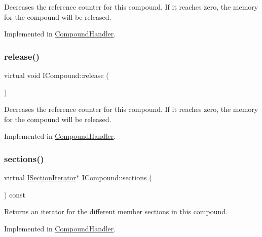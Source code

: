 Decreases the reference counter for this compound. If it reaches zero, the memory for the compound will be released. 

Implemented in \mbox{\hyperlink{class_compound_handler_a29f352627cbc021762c72835dfb63778}{Compound\+Handler}}.

\mbox{\label{class_i_compound_a5388c74d390323ce610f752a01456b21}} 
\subsubsection{\texorpdfstring{release()}{release()}\hspace{0.1cm}{\footnotesize\ttfamily [2/2]}}
{\footnotesize\ttfamily virtual void I\+Compound\+::release (\begin{DoxyParamCaption}{ }\end{DoxyParamCaption})\hspace{0.3cm}{\ttfamily [pure virtual]}}

Decreases the reference counter for this compound. If it reaches zero, the memory for the compound will be released. 

Implemented in \mbox{\hyperlink{class_compound_handler_a29f352627cbc021762c72835dfb63778}{Compound\+Handler}}.

\mbox{\label{class_i_compound_a966a7cac6a4f33f16ef869e74855ab3b}} 
\subsubsection{\texorpdfstring{sections()}{sections()}\hspace{0.1cm}{\footnotesize\ttfamily [1/2]}}
{\footnotesize\ttfamily virtual \mbox{\hyperlink{class_i_section_iterator}{I\+Section\+Iterator}}$\ast$ I\+Compound\+::sections (\begin{DoxyParamCaption}{ }\end{DoxyParamCaption}) const\hspace{0.3cm}{\ttfamily [pure virtual]}}

Returns an iterator for the different member sections in this compound. 

Implemented in \mbox{\hyperlink{class_compound_handler_ac692ed207cfa36644d6844e77d6d4fc2}{Compound\+Handler}}.


